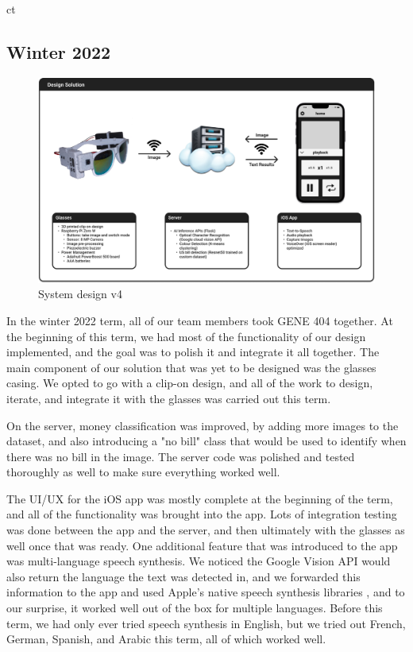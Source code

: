 ct\documentclass[a4paper,11pt]{article}
\begin{document}
\subsection{Winter 2022}
\label{winter-2022-design}
\begin{figure}[H]
\centering
\includegraphics[scale=0.265]{img/system_diagrams/system_diagram_v4.png}
\caption{System design v4}
\label{fig:system_diagram_v4}
\end{figure}

In the winter 2022 term, all of our team members took GENE 404 together. At the beginning of this term, we had most of the functionality of our design implemented, and the goal was to polish it and integrate it all together. The main component of our solution that was yet to be designed was the glasses casing. We opted to go with a clip-on design, and all of the work to design, iterate, and integrate it with the glasses was carried out this term.

On the server, money classification was improved, by adding more images to the dataset, and also introducing a "no bill" class that would be used to identify when there was no bill in the image. The server code was polished and tested thoroughly as well to make sure everything worked well.

The UI/UX for the iOS app was mostly complete at the beginning of the term, and all of the functionality was brought into the app. Lots of integration testing was done between the app and the server, and then ultimately with the glasses as well once that was ready. One additional feature that was introduced to the app was multi-language speech synthesis. We noticed the Google Vision API would also return the language the text was detected in, and we forwarded this information to the app and used Apple's native speech synthesis libraries \cite{apple-speech-synthesis}, and to our surprise, it worked well out of the box for multiple languages. Before this term, we had only ever tried speech synthesis in English, but we tried out French, German, Spanish, and Arabic this term, all of which worked well.
\end{document}
